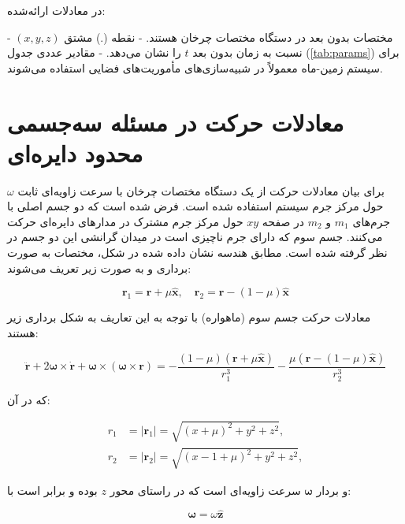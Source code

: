 در معادلات ارائه‌شده:

- $(x,y,z)$ مختصات بدون بعد در دستگاه مختصات چرخان هستند.
- نقطه (.) مشتق نسبت به زمان بدون بعد $t$ را نشان می‌دهد.
- مقادیر عددی جدول (\ref{tab:params}) برای سیستم زمین-ماه معمولاً در شبیه‌سازی‌های مأموریت‌های فضایی استفاده می‌شوند.














\section{معادلات حرکت در مسئله سه‌جسمی محدود دایره‌ای}

برای بیان معادلات حرکت از یک دستگاه مختصات چرخان با سرعت زاویه‌ای ثابت $\omega$ حول مرکز جرم سیستم استفاده شده است. فرض شده است که دو جسم اصلی با جرم‌های $m_1$ و $m_2$ در صفحه $xy$ حول مرکز جرم مشترک در مدارهای دایره‌ای حرکت می‌کنند. جسم سوم که دارای جرم ناچیزی است در میدان گرانشی این دو جسم در نظر گرفته شده است. مطابق هندسه نشان داده شده در شکل، مختصات به صورت برداری و به صورت زیر تعریف می‌شوند:

\begin{equation}
	\mathbf{r}_1 = \mathbf{r} + \mu \hat{\mathbf{x}}, \quad \mathbf{r}_2 = \mathbf{r} - (1-\mu) \hat{\mathbf{x}}
\end{equation}

معادلات حرکت جسم سوم (ماهواره) با توجه به این تعاریف به شکل برداری زیر هستند:

\begin{equation}
	\ddot{\mathbf{r}} + 2 \mathbf{\omega} \times \dot{\mathbf{r}} + \mathbf{\omega} \times (\mathbf{\omega} \times \mathbf{r}) = -\dfrac{(1-\mu)(\mathbf{r}+\mu\hat{\mathbf{x}})}{r_1^3} - \dfrac{\mu(\mathbf{r}-(1-\mu)\hat{\mathbf{x}})}{r_2^3}
\end{equation}

که در آن:

\begin{align}
	r_1 &= |\mathbf{r}_1| = \sqrt{(x+\mu)^2 + y^2 + z^2},\\[6pt]
	r_2 &= |\mathbf{r}_2| = \sqrt{(x-1+\mu)^2 + y^2 + z^2},
\end{align}

و بردار $\mathbf{\omega}$ سرعت زاویه‌ای است که در راستای محور $z$ بوده و برابر است با:

\begin{equation}
	\mathbf{\omega} = \omega \hat{\mathbf{z}}
\end{equation}

